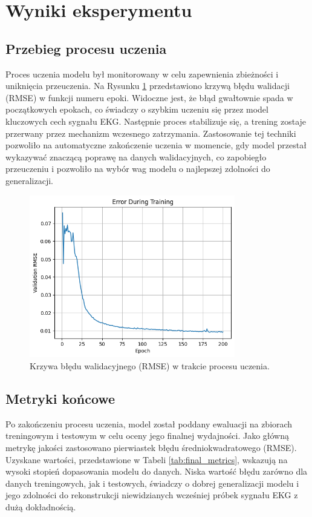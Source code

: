 \documentclass[12pt,a4paper]{article}
\begin{document}
\section{Wyniki eksperymentu}

\subsection{Przebieg procesu uczenia}

Proces uczenia modelu był monitorowany w celu zapewnienia zbieżności i uniknięcia przeuczenia. Na Rysunku \ref{fig:training_error} przedstawiono krzywą błędu walidacji (RMSE) w funkcji numeru epoki. Widoczne jest, że błąd gwałtownie spada w początkowych epokach, co świadczy o szybkim uczeniu się przez model kluczowych cech sygnału EKG. Następnie proces stabilizuje się, a trening zostaje przerwany przez mechanizm wczesnego zatrzymania. Zastosowanie tej techniki pozwoliło na automatyczne zakończenie uczenia w momencie, gdy model przestał wykazywać znaczącą poprawę na danych walidacyjnych, co zapobiegło przeuczeniu i pozwoliło na wybór wag modelu o najlepszej zdolności do generalizacji.

\begin{figure}[H]
    \centering
    \includegraphics[width=0.8\textwidth]{training_error.png}
    \caption{Krzywa błędu walidacyjnego (RMSE) w trakcie procesu uczenia.}
    \label{fig:training_error}
\end{figure}

\subsection{Metryki końcowe}

Po zakończeniu procesu uczenia, model został poddany ewaluacji na zbiorach treningowym i testowym w celu oceny jego finalnej wydajności. Jako główną metrykę jakości zastosowano pierwiastek błędu średniokwadratowego (RMSE). Uzyskane wartości, przedstawione w Tabeli \ref{tab:final_metrics}, wskazują na wysoki stopień dopasowania modelu do danych. Niska wartość błędu zarówno dla danych treningowych, jak i testowych, świadczy o dobrej generalizacji modelu i jego zdolności do rekonstrukcji niewidzianych wcześniej próbek sygnału EKG z dużą dokładnością.
\end{document}
